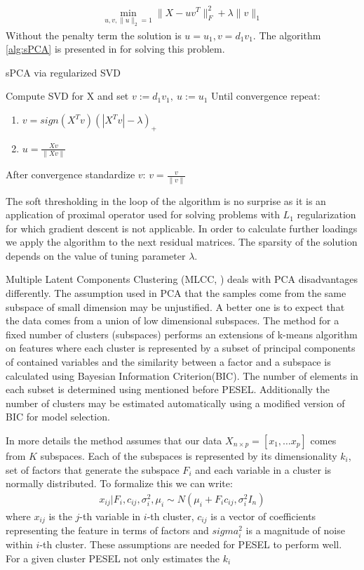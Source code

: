 \documentclass[12pt, wide]{mwart}
\begin{document}
\begin{align*}
    \min_{u,v, \|u\|_2=1}\|X - uv^T\|_F^2 + \lambda \| v \|_1
\end{align*}
Without the penalty term the solution is $u = u_1, v=d_1v_1$. The algorithm \ref{alg:sPCA} is presented in \cite{SPCAnew} for solving this problem.
\begin{algorithm}
\caption{sPCA via regularized SVD}
\label{alg:sPCA}          
\begin{algorithmic}                    
    \STATE Compute SVD for X and set $v := d_1v_1, \ u := u_1$
    \STATE Until convergence repeat:
    \begin{enumerate}
        \item $v = sign(X^Tv)(|X^Tv| - \lambda)_+$
        \item $u = \frac{Xv}{\|Xv\|}$
    \end{enumerate}
    \STATE After convergence standardize $v$: $v = \frac{v}{\|v\|}$
\end{algorithmic}
\end{algorithm}

The soft thresholding in the loop of the algorithm is no surprise as it is an application of proximal operator used for solving problems with $L_1$ regularization for which gradient descent is not applicable. In order to calculate further loadings we apply the algorithm to the next residual matrices. The sparsity of the solution depends on the value of tuning parameter $\lambda$.

Multiple Latent Components Clustering (MLCC, \cite{MLCC}) deals with PCA disadvantages differently. The assumption used in PCA that the samples come from the same subspace of small dimension may be unjustified. A better one is to expect that the data comes from a union of low dimensional subspaces. The method for a fixed number of clusters (subspaces) performs an extensions of k-means algorithm on features where each cluster is represented by a subset of principal components of contained variables and the similarity between a factor and a subspace is calculated using Bayesian Information Criterion(BIC). The number of elements in each subset is determined using mentioned before PESEL. Additionally the number of clusters may be estimated automatically using a modified version of BIC for model selection. 

In more details the method assumes that our data $X_{n\times p} = [x_1, \ldots x_p]$ comes from $K$ subspaces. Each of the subspaces is represented by its dimensionality $k_i$, set of factors that generate the subspace $F_i$ and each variable in a cluster is normally distributed. To formalize this we can write:
\begin{align*}
    x_{i j} | F_{i}, c_{i j}, \sigma_{i}^{2}, \mu_{i} \sim N\left(\mu_{i} + F_{i} c_{i j}, \sigma_{i}^{2} I_{n}\right)
\end{align*} 
where $x_{ij}$ is the $j$-th variable in $i$-th cluster, $c_{ij}$ is a vector of coefficients representing the feature in terms of factors and $sigma_i^2$ is a magnitude of noise within $i$-th cluster. These assumptions are needed for PESEL to perform well. For a given cluster PESEL not only estimates the $k_i$ 
\end{document}
